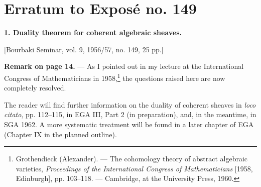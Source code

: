 \clearpage
\chapter*{Erratum to Exposé no. 149}
\setcounter{footnote}{0}

\noindent\textbf{1. Duality theorem for coherent algebraic sheaves.}

\begin{center}
[Bourbaki Seminar, vol. 9, 1956/57, no. 149, 25 pp.]
\end{center}

\noindent\textbf{Remark on page 14.} --- As I pointed out in my lecture at the
International Congress of Mathematicians in 1958,\footnote{Grothendieck
(Alexander). --- The cohomology theory of abstract algebraic varieties,
\emph{Proceedings of the International Congress of Mathematicians}
[1958, Edinburgh], pp. 103--118. --- Cambridge, at the University Press, 1960.}
the questions raised here are now completely resolved.

The reader will find further information on the duality of coherent sheaves in
\emph{loco citato}\footnotemark[1], pp. 112--115, in EGA III, Part 2 (in
preparation), and, in the meantime, in SGA 1962. A more systematic treatment
will be found in a later chapter of EGA (Chapter IX in the planned outline).
